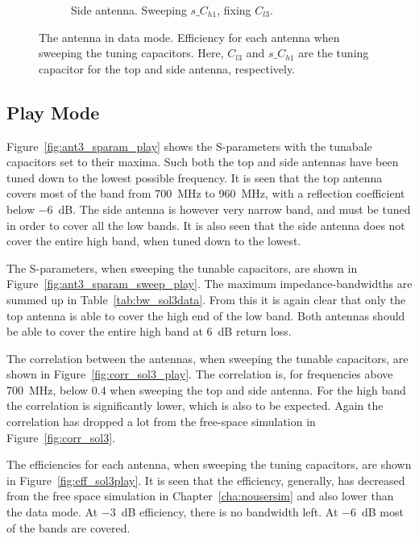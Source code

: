 \begin{figure}[htbp]
\begin{subfigure}{0.49\linewidth}
        \caption{Side antenna. Sweeping $s\_C_{h1}$, fixing $C_{l3}$.}
    \end{subfigure}
    \caption{The antenna in data mode. Efficiency for each antenna when sweeping the tuning capacitors. Here, $C_{l3}$ and $s\_C_{h1}$ are the tuning capacitor for the top and side antenna, respectively.}
    \label{fig:eff_sol3data}
\end{figure}


\FloatBarrier
\subsection{Play Mode}
Figure~\ref{fig:ant3_sparam_play} shows the S-parameters with the tunabale capacitors set to their maxima. Such both the top and side antennas have been tuned down to the lowest possible frequency. It is seen that the top antenna covers most of the band from \SI{700}{MHz} to \SI{960}{MHz}, with a reflection coefficient below \SI{-6}{dB}. The side antenna is however very narrow band, and must be tuned in order to cover all the low bands. It is also seen that the side antenna does not cover the entire high band, when tuned down to the lowest. 

The S-parameters, when sweeping the tunable capacitors, are shown in Figure~\ref{fig:ant3_sparam_sweep_play}. The maximum impedance-bandwidths are summed up in Table~\ref{tab:bw_sol3data}. From this it is again clear that only the top antenna is able to cover the high end of the low band. Both antennas should be able to cover the entire high band at \SI{6}{dB} return loss.

The correlation between the antennas, when sweeping the tunable capacitors, are shown in Figure~\ref{fig:corr_sol3_play}. The correlation is, for frequencies above \SI{700}{MHz}, below 0.4 when sweeping the top and side antenna. For the high band the correlation is significantly lower, which is also to be expected. Again the correlation has dropped a lot from the free-space simulation in Figure~\ref{fig:corr_sol3}.

The efficiencies for each antenna, when sweeping the tuning capacitors, are shown in Figure~\ref{fig:eff_sol3play}. It is seen that the efficiency, generally, has decreased from the free space simulation in Chapter~\ref{cha:nousersim} and also lower than the data mode. At \SI{-3}{dB} efficiency, there is no bandwidth left. At \SI{-6}{dB} most of the bands are covered.


